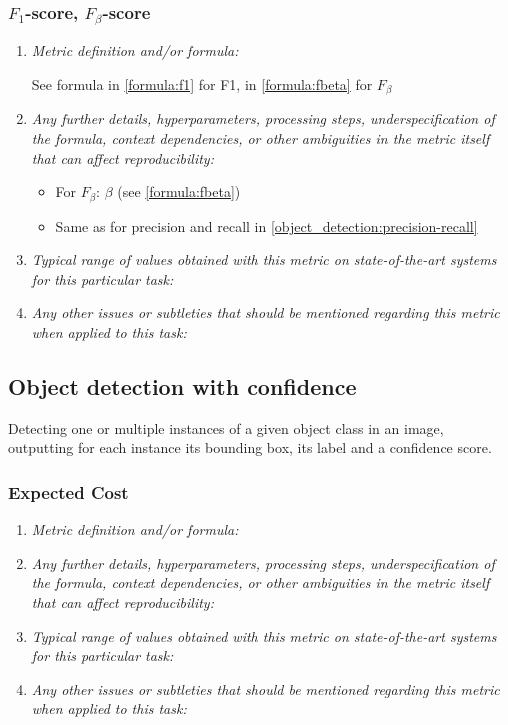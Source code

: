 \documentclass[a4paper,11pt]{article}
\begin{document}
        \subsubsection{$F_1$-score, $F_\beta$-score}
            \begin{enumerate}[label=\alph*.]
                \item \textit{Metric definition and/or formula:}

                See formula in \ref{formula:f1} for F1, in \ref{formula:fbeta} for $F_\beta$
                \bigskip
                \item \textit{Any further details, hyperparameters, processing steps, underspecification of the formula, context dependencies, or other ambiguities in the metric itself that can affect reproducibility:}

                \begin{itemize}
                    \item For $F_\beta$: $\beta$ (see \ref{formula:fbeta})
                    \item Same as for precision and recall in \ref{object_detection:precision-recall}
                \end{itemize}
                \bigskip
                \item \textit{Typical range of values obtained with this metric on state-of-the-art systems for this particular task:}
                \bigskip
                \item \textit{Any other issues or subtleties that should be mentioned regarding this metric when applied to this task:}
                \bigskip
            \end{enumerate}

    \subsection{Object detection with confidence}
        Detecting one or multiple instances of a given object class in an image, outputting for each instance its bounding box, its label and a confidence score.
        \subsubsection{Expected Cost}
            \begin{enumerate}[label=\alph*.]
                \item \textit{Metric definition and/or formula:}
                \bigskip
                \item \textit{Any further details, hyperparameters, processing steps, underspecification of the formula, context dependencies, or other ambiguities in the metric itself that can affect reproducibility:}
                \bigskip
                \item \textit{Typical range of values obtained with this metric on state-of-the-art systems for this particular task:}
                \bigskip
                \item \textit{Any other issues or subtleties that should be mentioned regarding this metric when applied to this task:}
                \bigskip
            \end{enumerate}
\end{document}
